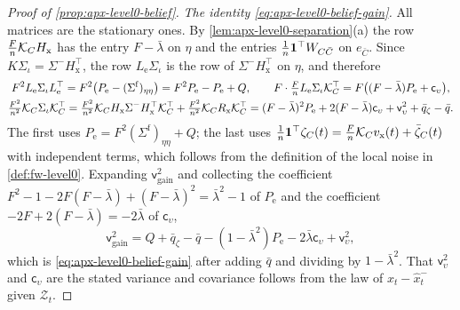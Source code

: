 \begin{proof}[Proof of \cref{prop:apx-level0-belief}]
\emph{The identity \eqref{eq:apx-level0-belief-gain}.} All matrices are the stationary ones. By \cref{lem:apx-level0-separation}(a) the row $\frac Fn\mathcal{K}_CH_{\mathrm x}$ has the entry $F-\bar\lambda$ on $\eta$ and the entries $\frac1n\mathbf{1}^\top W_{C\bar C}$ on $e_{\bar C}$. Since $K\Sigma_\iota=\Sigma^-H_{\mathrm x}^\top$, the row $L_{\mathrm e}\Sigma_\iota$ is the row of $\Sigma^-H_{\mathrm x}^\top$ on $\eta$, and therefore
\begin{equation*}
\begin{gathered}
F^2L_{\mathrm e}\Sigma_\iota L_{\mathrm e}^\top=F^2\bigl(P_{\mathrm e}-(\Sigma^{\mathrm f})_{\eta\eta}\bigr)=F^2P_{\mathrm e}-P_{\mathrm e}+Q,\qquad F\cdot\tfrac FnL_{\mathrm e}\Sigma_\iota\mathcal{K}_C^\top=F\bigl((F-\bar\lambda)P_{\mathrm e}+\mathsf c_\upsilon\bigr),\\
\tfrac{F^2}{n^2}\mathcal{K}_C\Sigma_\iota\mathcal{K}_C^\top=\tfrac{F^2}{n^2}\mathcal{K}_CH_{\mathrm x}\Sigma^-H_{\mathrm x}^\top\mathcal{K}_C^\top+\tfrac{F^2}{n^2}\mathcal{K}_CR_{\mathrm x}\mathcal{K}_C^\top=(F-\bar\lambda)^2P_{\mathrm e}+2(F-\bar\lambda)\mathsf c_\upsilon+\mathsf v_\upsilon^2+\bar q_\zeta-\bar q .
\end{gathered}
\end{equation*}
The first uses $P_{\mathrm e}=F^2(\Sigma^{\mathrm f})_{\eta\eta}+Q$; the last uses $\frac1n\mathbf{1}^\top\zeta_C(t)=\frac Fn\mathcal{K}_Cv_{\mathrm x}(t)+\bar\zeta_C(t)$ with independent terms, which follows from the definition of the local noise in \cref{def:fw-level0}. Expanding $\mathsf v_{\mathrm{gain}}^2$ and collecting the coefficient $F^2-1-2F(F-\bar\lambda)+(F-\bar\lambda)^2=\bar\lambda^2-1$ of $P_{\mathrm e}$ and the coefficient $-2F+2(F-\bar\lambda)=-2\bar\lambda$ of $\mathsf c_\upsilon$,
\begin{equation*}
\mathsf v_{\mathrm{gain}}^2=Q+\bar q_\zeta-\bar q-(1-\bar\lambda^2)P_{\mathrm e}-2\bar\lambda\mathsf c_\upsilon+\mathsf v_\upsilon^2 ,
\end{equation*}
which is \eqref{eq:apx-level0-belief-gain} after adding $\bar q$ and dividing by $1-\bar\lambda^2$. That $\mathsf v_\upsilon^2$ and $\mathsf c_\upsilon$ are the stated variance and covariance follows from the law of $x_t-\hat x^-_t$ given $\mathcal Z_t$.


\end{proof}
